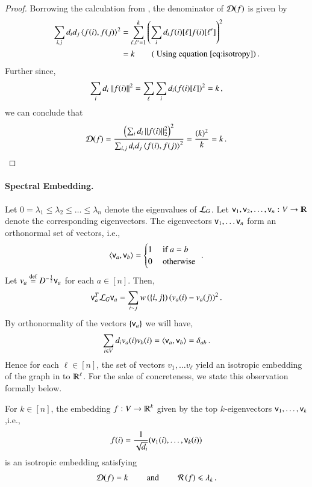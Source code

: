 \documentclass[11pt]{article}
\newcommand{\eigvec}{{\sf v}}
\newcommand{\trudim}{\cD}
\newcommand{\ralsymb}{\cR}
\newcommand{\ral}[1]{\ralsymb\left(#1\right)} %
\begin{document}
%
\begin{proof}
	Borrowing the calculation from , the denominator of $\trudim(f)$ is given by
%
\begin{align*}
\sum_{i,j} d_i d_j  \inprod{f(i),f(j)}^2  
%
& =   \sum_{\ell, \ell' = 1}^k  \paren{\sum_{i} d_i f(i)[\ell]f(i)[\ell'] }^2  \\
%
&= k  \qquad (\text{ Using equation }\eqref{eq:isotropy})\mper
\end{align*}
%
Further since,
%
\begin{align*}
	\sum_{i} d_i \left\lVert f(i)\right\rVert^2 = \sum_{\ell} \sum_{i} d_i (f(i)[\ell])^2  = k \,,
\end{align*}
%
we can conclude that
%
\begin{align*}
%
\trudim(f) = \frac{\paren{ \sum_{i} d_i \norm{f(i)}_2^2 }^2 }
	{\sum_{i,j} d_i d_j  \inprod{f(i),f(j)}^2 } = \frac{ (k)^2}{k} = k \mper 
%
\end{align*}
%
\end{proof}

\paragraph{Spectral Embedding.}
%
Let $0 = \lambda_1 \leq \lambda_2 \leq \ldots  \leq \lambda_n$ denote the eigenvalues of $\mathcal L_G$.
%
Let $\eigvec_1, \eigvec_2, \ldots, \eigvec_n : V \to \R$ denote the corresponding eigenvectors.  
%
The eigenvectors $\eigvec_1, \ldots \eigvec_n$ form an orthonormal set of vectors, i.e.,
\[ \inprod{\eigvec_a, \eigvec_b} = \begin{cases} 1 & \textrm{ if } a = b \\ 
		0 &  \textrm{ otherwise } \end{cases} \mper \]
%
Let $v_a \defeq D^{-\frac{1}{2}} \eigvec_a$ for each $a \in [n]$.
%
Then,
\[ \eigvec_a^T \cL_G \eigvec_a = \sum_{i \sim j} w\paren{\set{i,j}} (v_a(i) - v_a(j))^2 \mper \]
%
By orthonormality of the vectors $\set{ \eigvec_a }$ we will have,
\[  \sum_{i \in V} d_i v_a(i) v_b(i) = \inprod{\eigvec_a, \eigvec_b} = \delta_{ab} \mper \]
%
Hence for each $\ell \in [n]$, the set of vectors $v_{1},\ldots
v_{\ell}$ yield an isotropic embedding of the graph in to $\R^\ell$.
%
For the sake of concreteness, we state this observation formally
below.

\begin{lemma}
\label{lem:embedding}
For $k \in [n]$,  the embedding $f: V \to \R^k$ given by the top $k$-eigenvectors 
$\eigvec_1,\ldots, \eigvec_k$ ,i.e.,
%
\[ f(i) = \frac{1}{\sqrt{d_i} }(\eigvec_{1}(i), \ldots, \eigvec_{k}(i)) \]
%
is an isotropic embedding satisfying
%
\[ \trudim(f) = k  \qquad \textrm{ and } \qquad \ral{f} \leq \lambda_k \mper \]
%
\end{lemma}
\end{document}
